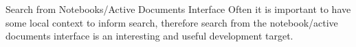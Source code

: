 \begin{workpackage}
\begin{wpdelivs}
\begin{wpdeliv}[id=nbad-search,due=42,nature=O,dissem=PU]
  {Search from Notebooks/Active Documents Interface} Often it is important to have some
  local context to inform search, therefore search from the notebook/active documents
  interface is an interesting and useful development target.
\end{wpdeliv}



  \end{wpdelivs}
\end{workpackage}


